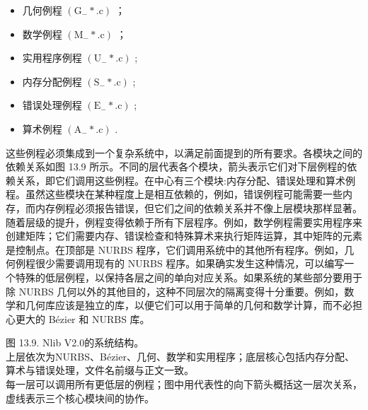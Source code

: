 \documentclass[../main.tex]{subfiles}
\begin{document}
\begin{itemize}
\item 几何例程 \(\left( {{\mathrm{G}}_{ - } * .\mathrm{c}}\right)\) ；
\end{itemize}

\begin{itemize}
\item 数学例程 \(\left( {{\mathrm{M}}_{ - } * .\mathrm{c}}\right)\) ；
\end{itemize}

\begin{itemize}
\item 实用程序例程 \(\left( {{\mathrm{U}}_{ - } * .\mathrm{c}}\right)\) ;
\end{itemize}

\begin{itemize}
\item 内存分配例程 \(\left( {{\mathrm{S}}_{ - } * .\mathrm{c}}\right)\) ;
\end{itemize}

\begin{itemize}
\item 错误处理例程 \(\left( {{\mathrm{E}}_{ - } * .\mathrm{c}}\right)\) ;
\end{itemize}

\begin{itemize}
\item 算术例程 \(\left( {{\mathrm{A}}_{ - } * .\mathrm{c}}\right)\) .
\end{itemize}

这些例程必须集成到一个复杂系统中，以满足前面提到的所有要求。各模块之间的依赖关系如图 13.9 所示。不同的层代表各个模块，箭头表示它们对下层例程的依赖关系，即它们调用这些例程。在中心有三个模块:内存分配、错误处理和算术例程。虽然这些模块在某种程度上是相互依赖的，例如，错误例程可能需要一些内存，而内存例程必须报告错误，但它们之间的依赖关系并不像上层模块那样显著。随着层级的提升，例程变得依赖于所有下层程序。例如，数学例程需要实用程序来创建矩阵；它们需要内存、错误检查和特殊算术来执行矩阵运算，其中矩阵的元素是控制点。在顶部是 NURBS 程序，它们调用系统中的其他所有程序。例如，几何例程很少需要调用现有的 NURBS 程序。如果确实发生这种情况，可以编写一个特殊的低层例程，以保持各层之间的单向对应关系。如果系统的某些部分要用于除 NURBS 几何以外的其他目的，这种不同层次的隔离变得十分重要。例如，数学和几何库应该是独立的库，以便它们可以用于简单的几何和数学计算，而不必担心更大的 Bézier 和 NURBS 库。

\begin{center}
\begin{minipage}{26cm}
\centering
{}
\par\smallskip
图 13.9. Nlib V2.0的系统结构。\\
上层依次为NURBS、B\'{e}zier、几何、数学和实用程序；底层核心包括内存分配、算术与错误处理，文件名前缀与正文一致。\\
每一层可以调用所有更低层的例程；图中用代表性的向下箭头概括这一层次关系，虚线表示三个核心模块间的协作。
\end{minipage}
\end{center}
\end{document}
